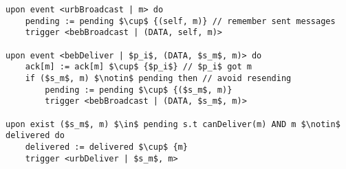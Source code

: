 \begin{lstlisting}[mathescape, caption= Uniformity reliable broadcast, captionpos=b]
upon event <urbBroadcast | m> do
    pending := pending $\cup$ {(self, m)} // remember sent messages
    trigger <bebBroadcast | (DATA, self, m)>

upon event <bebDeliver | $p_i$, (DATA, $s_m$, m)> do
    ack[m] := ack[m] $\cup$ {$p_i$} // $p_i$ got m
    if ($s_m$, m) $\notin$ pending then // avoid resending
        pending := pending $\cup$ {($s_m$, m)}
        trigger <bebBroadcast | (DATA, $s_m$, m)>

upon exist ($s_m$, m) $\in$ pending s.t canDeliver(m) AND m $\notin$ delivered do
    delivered := delivered $\cup$ {m}
    trigger <urbDeliver | $s_m$, m>
\end{lstlisting}
